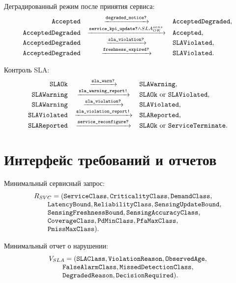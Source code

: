 \documentclass[10pt,a4paper]{article}
\newcommand{\code}[1]{\ifmmode\text{\ttfamily\detokenize{#1}}\else\texttt{\detokenize{#1}}\fi}
\begin{document}
Деградированный режим после принятия сервиса:
\[
\begin{array}{rcl}
\code{Accepted} & \xrightarrow{\code{degraded_notice?}} & \code{AcceptedDegraded},\\
\code{AcceptedDegraded} & \xrightarrow{\code{service_kpi_update?}\land SLA^{sens}_{OK}} & \code{Accepted},\\
\code{AcceptedDegraded} & \xrightarrow{\code{sla_violation?}} & \code{SLAViolated},\\
\code{AcceptedDegraded} & \xrightarrow{\code{freshness_expired?}} & \code{SLAViolated}.
\end{array}
\]

Контроль SLA:
\[
\begin{array}{rcl}
\code{SLAOk} & \xrightarrow{\code{sla_warn?}} & \code{SLAWarning},\\
\code{SLAWarning} & \xrightarrow{\code{sla_warning_report!}} & \code{SLAOk}\ \text{or}\ \code{SLAViolated},\\
\code{SLAWarning} & \xrightarrow{\code{sla_violation?}} & \code{SLAViolated},\\
\code{SLAViolated} & \xrightarrow{\code{sla_violation_report!}} & \code{SLAReported},\\
\code{SLAReported} & \xrightarrow{\code{service_reconfigure?}} & \code{SLAOk}\ \text{or}\ \code{ServiceTerminate}.
\end{array}
\]

\section{Интерфейс требований и отчетов}

Минимальный сервисный запрос:
\[
\begin{array}{l}
R_{SVC}=(\code{ServiceClass},\code{CriticalityClass},\code{DemandClass},\\
\qquad \code{LatencyBound},\code{ReliabilityClass},\code{SensingUpdateBound},\\
\qquad \code{SensingFreshnessBound},\code{SensingAccuracyClass},\\
\qquad \code{CoverageClass},\code{PdMinClass},\code{PfaMaxClass},\\
\qquad \code{PmissMaxClass}).
\end{array}
\]

Минимальный отчет о нарушении:
\[
\begin{array}{l}
V_{SLA}=(\code{SLAClass},\code{ViolationReason},\code{ObservedAge},\\
\qquad \code{FalseAlarmClass},\code{MissedDetectionClass},\\
\qquad \code{DegradedReason},\code{DecisionRequired}).
\end{array}
\]
\end{document}

